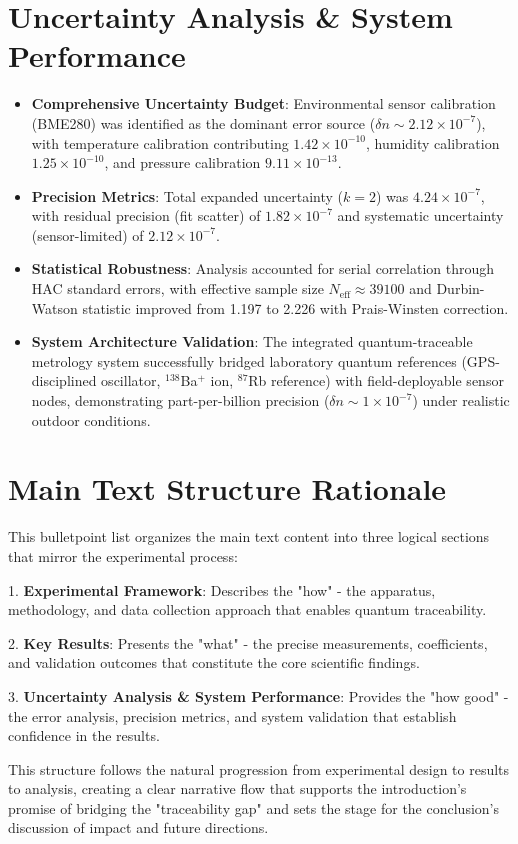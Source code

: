 \documentclass[aip,reprint,groupedaddress,onecolumn,superscriptaddress]{revtex4-2}
\begin{document}
\section{Uncertainty Analysis \& System Performance}
\begin{itemize}
    \item \textbf{Comprehensive Uncertainty Budget}: Environmental sensor calibration (BME280) was identified as the dominant error source ($\delta n \sim 2.12\times10^{-7}$), with temperature calibration contributing $1.42 \times 10^{-10}$, humidity calibration $1.25 \times 10^{-10}$, and pressure calibration $9.11 \times 10^{-13}$.
    
    \item \textbf{Precision Metrics}: Total expanded uncertainty ($k=2$) was $4.24 \times 10^{-7}$, with residual precision (fit scatter) of $1.82 \times 10^{-7}$ and systematic uncertainty (sensor-limited) of $2.12 \times 10^{-7}$.
    
    \item \textbf{Statistical Robustness}: Analysis accounted for serial correlation through HAC standard errors, with effective sample size $N_{\text{eff}} \approx \num{39100}$ and Durbin-Watson statistic improved from 1.197 to 2.226 with Prais-Winsten correction.
    
    \item \textbf{System Architecture Validation}: The integrated quantum-traceable metrology system successfully bridged laboratory quantum references (GPS-disciplined oscillator, $^{138}$Ba$^+$ ion, $^{87}$Rb reference) with field-deployable sensor nodes, demonstrating part-per-billion precision ($\delta n \sim 1 \times 10^{-7}$) under realistic outdoor conditions.
\end{itemize}

\newpage

\section*{Main Text Structure Rationale}

This bulletpoint list organizes the main text content into three logical sections that mirror the experimental process:

1. \textbf{Experimental Framework}: Describes the "how" - the apparatus, methodology, and data collection approach that enables quantum traceability.

2. \textbf{Key Results}: Presents the "what" - the precise measurements, coefficients, and validation outcomes that constitute the core scientific findings.

3. \textbf{Uncertainty Analysis \& System Performance}: Provides the "how good" - the error analysis, precision metrics, and system validation that establish confidence in the results.

This structure follows the natural progression from experimental design to results to analysis, creating a clear narrative flow that supports the introduction's promise of bridging the "traceability gap" and sets the stage for the conclusion's discussion of impact and future directions.
\end{document}
